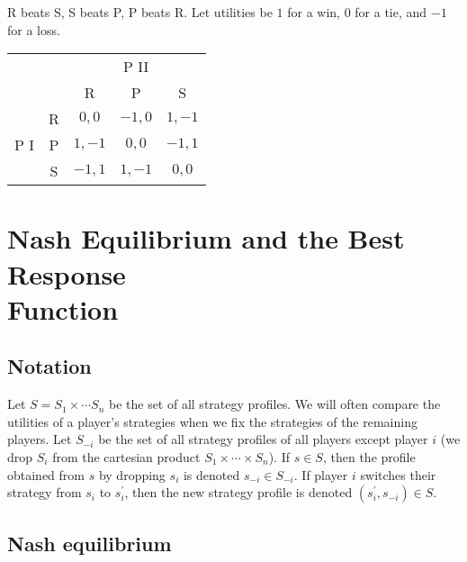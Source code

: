 \documentclass[12pt,letterpaper]{report}
\begin{document}
\begin{ex}
  R beats S, S beats P, P beats R.
  Let utilities be $1$ for a win, $0$ for a tie, and $-1$ for a loss.

  \begin{center}
    \renewcommand{\arraystretch}{1.25}
    \begin{tabular}{c c |c|c|c|}
      \multicolumn{2}{c}{} & \multicolumn{3}{c}{P II} \\
      \multicolumn{2}{c}{} & \multicolumn{1}{c}{R} & \multicolumn{1}{c}{P}
        & \multicolumn{1}{c}{S} \\
      \cline{3-5}
      \multirow{3}{*}{P I} & R & $0, 0$ & $-1, 0$ & $1, -1$ \\
      \cline{3-5}
      & P & $1, -1$ & $0, 0$ & $-1, 1$ \\
      \cline{3-5}
      & S & $-1, 1$ & $1, -1$ & $0, 0$ \\
      \cline{3-5}
    \end{tabular}
  \end{center}
\end{ex}

\section[Nash Equilibrium and the Best Response Function]{%
  Nash Equilibrium and the Best Response \\ Function
}

\subsection{Notation}

Let $S = S_1 \times \cdots S_n$ be the set of all strategy profiles.
We will often compare the utilities of a player's strategies when we fix the strategies of the
remaining players.
Let $S_{-i}$ be the set of all strategy profiles of all players except player $i$ (we drop $S_i$
from the cartesian product $S_1 \times \cdots \times S_n$).
If $s \in S$, then the profile obtained from $s$ by dropping $s_i$ is denoted $s_{-i} \in S_{-i}$.
If player $i$ switches their strategy from $s_i$ to $s_i^{\prime}$, then the new strategy profile
is denoted $(s_i^{\prime}, s_{-i}) \in S$.

\subsection{Nash equilibrium}
\end{document}
